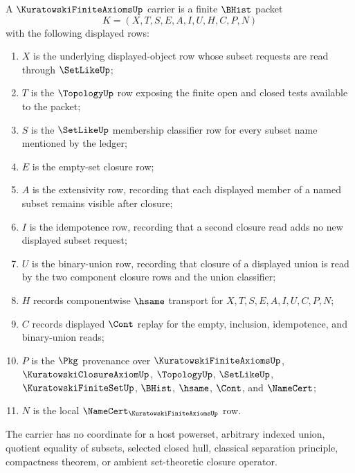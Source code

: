 \begin{definition}
\label{def:kuratowski-finite-axioms-carrier}
A $\KuratowskiFiniteAxiomsUp$ carrier is a finite $\BHist$ packet
$$
K=(X,T,S,E,A,I,U,H,C,P,N)
$$
with the following displayed rows:
\begin{enumerate}
\item $X$ is the underlying displayed-object row whose subset requests are read through $\SetLikeUp$;
\item $T$ is the $\TopologyUp$ row exposing the finite open and closed tests available to the packet;
\item $S$ is the $\SetLikeUp$ membership classifier row for every subset name mentioned by the ledger;
\item $E$ is the empty-set closure row;
\item $A$ is the extensivity row, recording that each displayed member of a named subset remains visible after closure;
\item $I$ is the idempotence row, recording that a second closure read adds no new displayed subset request;
\item $U$ is the binary-union row, recording that closure of a displayed union is read by the two component closure rows and the union classifier;
\item $H$ records componentwise $\hsame$ transport for $X,T,S,E,A,I,U,C,P,N$;
\item $C$ records displayed $\Cont$ replay for the empty, inclusion, idempotence, and binary-union reads;
\item $P$ is the $\Pkg$ provenance over $\KuratowskiFiniteAxiomsUp$, $\KuratowskiClosureAxiomUp$, $\TopologyUp$, $\SetLikeUp$, $\KuratowskiFiniteSetUp$, $\BHist$, $\hsame$, $\Cont$, and $\NameCert$;
\item $N$ is the local $\NameCert_{\KuratowskiFiniteAxiomsUp}$ row.
\end{enumerate}
The carrier has no coordinate for a host powerset, arbitrary indexed union, quotient equality of subsets, selected closed hull, classical separation principle, compactness theorem, or ambient set-theoretic closure operator.
\end{definition}

